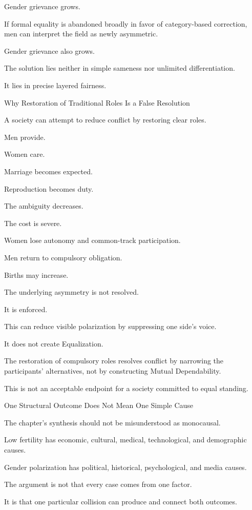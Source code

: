 Gender grievance grows.

If formal equality is abandoned broadly in favor of category-based correction, men can interpret the field as newly asymmetric.

Gender grievance also grows.

The solution lies neither in simple sameness nor unlimited differentiation.

It lies in precise layered fairness.

Why Restoration of Traditional Roles Is a False Resolution

A society can attempt to reduce conflict by restoring clear roles.

Men provide.

Women care.

Marriage becomes expected.

Reproduction becomes duty.

The ambiguity decreases.

The cost is severe.

Women lose autonomy and common-track participation.

Men return to compulsory obligation.

Births may increase.

The underlying asymmetry is not resolved.

It is enforced.

This can reduce visible polarization by suppressing one side’s voice.

It does not create Equalization.

The restoration of compulsory roles resolves conflict by narrowing the participants’ alternatives, not by constructing Mutual Dependability.

This is not an acceptable endpoint for a society committed to equal standing.

One Structural Outcome Does Not Mean One Simple Cause

The chapter’s synthesis should not be misunderstood as monocausal.

Low fertility has economic, cultural, medical, technological, and demographic causes.

Gender polarization has political, historical, psychological, and media causes.

The argument is not that every case comes from one factor.

It is that one particular collision can produce and connect both outcomes.

